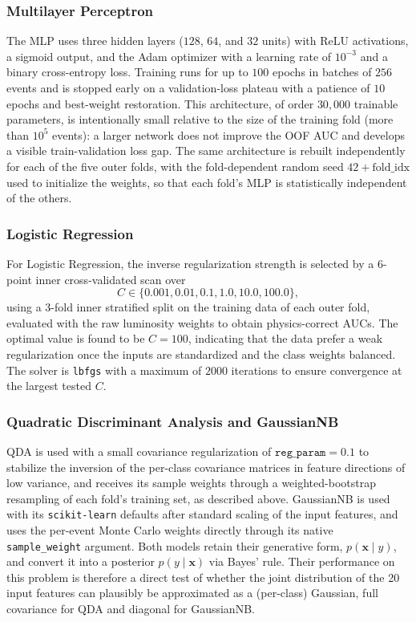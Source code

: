 \documentclass[conference]{IEEEtran}
\begin{document}
{\subsubsection{Multilayer Perceptron}
 
The MLP uses three hidden layers ($128$, $64$, and $32$ units)
with ReLU activations, a sigmoid output, and the Adam optimizer
with a learning rate of $10^{-3}$ and a binary cross-entropy
loss. Training runs for up to $100$ epochs in batches of
$256$ events and is stopped early on a validation-loss plateau
with a patience of $10$ epochs and best-weight restoration.
This architecture, of order $30{,}000$ trainable parameters,
is intentionally small relative to the size of the training
fold (more than $10^5$ events): a larger network does not
improve the OOF AUC and develops a visible train-validation
loss gap. The same architecture is rebuilt independently for
each of the five outer folds, with the fold-dependent random
seed $42+\text{fold\_idx}$ used to initialize the weights, so
that each fold's MLP is statistically independent of the others.
 
\subsubsection{Logistic Regression}
 
For Logistic Regression, the inverse regularization strength
is selected by a $6$-point inner cross-validated scan over
\[
C\in\{0.001,0.01,0.1,1.0,10.0,100.0\},
\]
using a $3$-fold inner stratified split on the training data
of each outer fold, evaluated with the raw luminosity weights
to obtain physics-correct AUCs. The optimal value is found to
be $C=100$, indicating that the data prefer a weak regularization
once the inputs are standardized and the class weights balanced.
The solver is \texttt{lbfgs} with a maximum of $2000$ iterations
to ensure convergence at the largest tested $C$.
 
\subsubsection{Quadratic Discriminant Analysis and GaussianNB}
 
QDA is used with a small covariance regularization of
$\texttt{reg\_param}=0.1$ to stabilize the inversion of the
per-class covariance matrices in feature directions of low
variance, and receives its sample weights through a
weighted-bootstrap resampling of each fold's training set, as
described above. GaussianNB is used with its \texttt{scikit-learn}
defaults after standard scaling of the input features, and uses
the per-event Monte Carlo weights directly through its native
\texttt{sample\_weight} argument. Both models retain their
generative form, $p(\mathbf{x}\mid y)$, and convert it into a
posterior $p(y\mid \mathbf{x})$ via Bayes' rule. Their
performance on this problem is therefore a direct test of
whether the joint distribution of the 20 input features can
plausibly be approximated as a (per-class) Gaussian, full
covariance for QDA and diagonal for GaussianNB.
 
}
\end{document}
